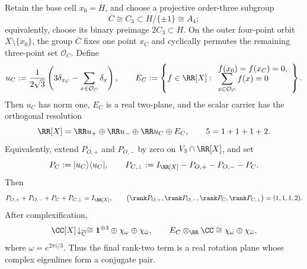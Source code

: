 \documentclass[11pt]{article}
\begin{document}
\begin{theorem}
\label{p1:thm:five-cell-trimer-resolution}
Retain the base cell \(x_0=H\), and choose a projective order-three subgroup
\[
    \overline C\cong C_3
    \subset H/\{\pm1\}\cong A_4;
\]
equivalently, choose its binary preimage \(2C_3\subset H\).  On the outer
four-point orbit \(X\setminus\{x_0\}\), the group \(\overline C\) fixes one
point \(x_C\) and cyclically permutes the remaining three-point set
\(\mathcal O_C\).  Define
\begin{equation}
\label{p1:eq:trimer-axis-vector-and-plane}
    u_C
    :=\frac{1}{2\sqrt3}
      \left(3\delta_{x_C}
      -\sum_{x\in\mathcal O_C}\delta_x\right),
    \qquad
    E_C
    :=\left\{f\in\RR[X]:
    \begin{array}{l}
      f(x_0)=f(x_C)=0,\\[-0.2em]
      \displaystyle\sum_{x\in\mathcal O_C}f(x)=0
    \end{array}
    \right\}.
\end{equation}
Then \(u_C\) has norm one, \(E_C\) is a real two-plane, and the scalar carrier
has the orthogonal resolution
\begin{equation}
\label{p1:eq:one-one-one-two-resolution}
    \RR[X]
    =\RR u_+
     \oplus\RR u_-
     \oplus\RR u_C
     \oplus E_C,
    \qquad
    5=1+1+1+2.
\end{equation}
Equivalently, extend \(P_{O,+}\) and \(P_{O,-}\) by zero on
\(V_3\cap\RR[X]\), and set
\[
    P_C:=|u_C\rangle\langle u_C|,
    \qquad
    P_{C,\perp}
    :=I_{\RR[X]}-P_{O,+}-P_{O,-}-P_C.
\]
Then
\begin{equation}
\label{p1:eq:one-one-one-two-projectors}
    P_{O,+}+P_{O,-}+P_C+P_{C,\perp}=I_{\RR[X]},
    \qquad
    \bigl(
      \rank P_{O,+},
      \rank P_{O,-},
      \rank P_C,
      \rank P_{C,\perp}
    \bigr)
    =(1,1,1,2).
\end{equation}
After complexification,
\begin{equation}
\label{p1:eq:C3-five-cell-character-branching}
    \CC[X]\!\downarrow_{\overline C}
    \cong
    \mathbf1^{\oplus3}
    \oplus\chi_{\omega}
    \oplus\chi_{\bar\omega},
    \qquad
    E_C\otimes_{\RR}\CC
    \cong\chi_{\omega}\oplus\chi_{\bar\omega},
\end{equation}
where \(\omega=e^{2\pi i/3}\).  Thus the final rank-two term is a real
rotation plane whose complex eigenlines form a conjugate pair.
\end{theorem}
\end{document}
